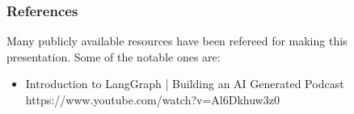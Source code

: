 \begin{frame}\frametitle{References}
Many publicly available resources have been refereed for making this presentation. Some of the notable ones are:
\footnotesize
\begin{itemize}
\item Introduction to LangGraph | Building an AI Generated Podcast https://www.youtube.com/watch?v=Al6Dkhuw3z0
\end{itemize}

\end{frame}